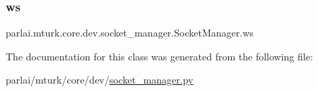 \subsubsection{\texorpdfstring{ws}{ws}}
{\footnotesize\ttfamily parlai.\+mturk.\+core.\+dev.\+socket\+\_\+manager.\+Socket\+Manager.\+ws}



The documentation for this class was generated from the following file\+:\begin{DoxyCompactItemize}
\item 
parlai/mturk/core/dev/\hyperlink{dev_2socket__manager_8py}{socket\+\_\+manager.\+py}\end{DoxyCompactItemize}
